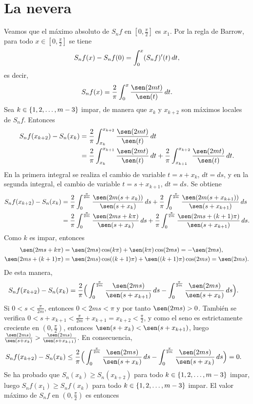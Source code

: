 \documentclass[a4paper, 12pt, oneside]{book}
\begin{document}
\chapter{La nevera}

Veamos que el máximo absoluto de $S_nf$ en $[0,\frac{\pi}{2}]$ es $x_1$. Por la regla de Barrow, para todo $x \in [0,\frac{\pi}{2}]$ se tiene
\[S_nf(x)-S_nf(0) = \integral[t]{0}{x}{(S_nf)'(t)},\]
es decir,
\[S_nf(x) = \frac{2}{\pi}\integral[t]{0}{x}{\frac{\sen(2mt)}{\sen(t)}}.\]
Sea $k \in \{1,2,\mathellipsis,m-3\}$ impar, de manera que $x_k$ y $x_{k+2}$ son máximos locales de $S_nf$. Entonces
\begin{align*}
    S_nf(x_{k+2})-S_n(x_k) &= \frac{2}{\pi}\integral[t]{x_k}{x_{k+2}}{\frac{\sen(2mt)}{\sen(t)}} \\
    &= \frac{2}{\pi}\integral[t]{x_k}{x_{k+1}}{\frac{\sen(2mt)}{\sen(t)}}+ \frac{2}{\pi}\integral[t]{x_{k+1}}{x_{k+2}}{\frac{\sen(2mt)}{\sen(t)}}.
\end{align*}
En la primera integral se realiza el cambio de variable $t = s+x_k$, $dt = ds$, y en la segunda integral, el cambio de variable $t = s+x_{k+1}$, $dt = ds$. Se obtiene
\begin{align*}
    S_nf(x_{k+2})-S_n(x_k) &= \frac{2}{\pi}\integral[s]{0}{\frac{\pi}{2m}}{\frac{\sen(2m(s+x_k))}{\sen(s+x_k)}}+ \frac{2}{\pi}\integral[s]{0}{\frac{\pi}{2m}}{\frac{\sen(2m(s+x_{k+1}))}{\sen(s+x_{k+1})}} \\
    &= \frac{2}{\pi}\integral[s]{0}{\frac{\pi}{2m}}{\frac{\sen(2ms + k\pi)}{\sen(s+x_k)}} + \frac{2}{\pi}\integral[s]{0}{\frac{\pi}{2m}}{\frac{\sen(2ms + (k+1)\pi)}{\sen(s+x_{k+1})}}.
\end{align*}
Como $k$ es impar, entonces
\begin{align*}
    \sen(2ms+k\pi) &= \sen(2ms)\cos(k\pi)+\sen(k\pi)\cos(2ms) = -\sen(2ms), \\
    \sen(2ms+(k+1)\pi) &= \sen(2ms)\cos((k+1)\pi)+\sen((k+1)\pi)\cos(2ms) = \sen(2ms).
\end{align*}
De esta manera,
\begin{align*}
    S_nf(x_{k+2})-S_n(x_k) &= \frac{2}{\pi}\Bigl(\,\integral[s]{0}{\frac{\pi}{2m}}{\frac{\sen(2ms)}{\sen(s+x_{k+1})}}-\integral[s]{0}{\frac{\pi}{2m}}{\frac{\sen(2ms)}{\sen(s+x_k)}}\Bigr).
\end{align*}
Si $0<s<\frac{\pi}{2m}$, entonces $0<2ms<\pi$ y por tanto $\sen(2ms) > 0$. También se verifica $0<s+x_{k+1} < \frac{\pi}{2m}+x_{k+1} = x_{k+2} < \frac{\pi}{2}$, y como el seno es estrictamente creciente en $(0,\frac{\pi}{2})$, entonces $\sen(s+x_k) < \sen(s+x_{k+1})$, luego $\frac{\sen(2ms)}{\sen(s+x_k)} > \frac{\sen(2ms)}{\sen(s+x_{k+1})}$. En consecuencia,
\begin{align*}
    S_nf(x_{k+2})-S_n(x_k) &\leq \frac{2}{\pi}\Bigl(\,\integral[s]{0}{\frac{\pi}{2m}}{\frac{\sen(2ms)}{\sen(s+x_{k})}}-\integral[s]{0}{\frac{\pi}{2m}}{\frac{\sen(2ms)}{\sen(s+x_k)}}\Bigr) = 0.
\end{align*}
Se ha probado que $S_n(x_k) \geq S_n(x_{k+2})$ para todo $k \in \{1,2,\mathellipsis,m-3\}$ impar, luego $S_nf(x_1) \geq S_nf(x_k)$ para todo $k \in \{1,2,\mathellipsis,m-3\}$ impar. El valor máximo de $S_nf$ en $(0,\frac{\pi}{2})$ es entonces
\end{document}
